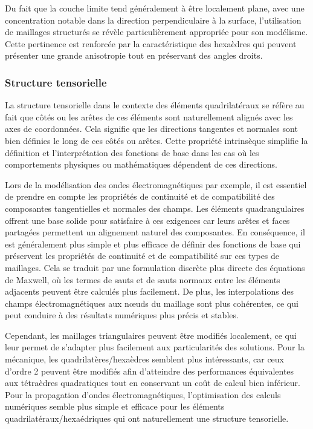 Du fait que la couche limite tend généralement à être localement plane, avec une concentration notable dans la direction perpendiculaire à la surface, l'utilisation de maillages structurés se révèle particulièrement appropriée pour son modélisme. Cette pertinence est renforcée par la caractéristique des hexaèdres qui peuvent présenter une grande anisotropie tout en préservant des angles droits. 

\subsubsection{Structure tensorielle}

 La structure tensorielle dans le contexte des éléments quadrilatéraux se réfère au fait que côtés ou les arêtes de ces éléments sont naturellement alignés avec les axes de coordonnées. Cela signifie que les directions tangentes et normales sont bien définies le long de ces côtés ou arêtes. Cette propriété intrinsèque simplifie la définition et l'interprétation des fonctions de base dans les cas où les comportements physiques ou mathématiques dépendent de ces directions.
 
 Lors de la modélisation des ondes électromagnétiques par exemple, il est essentiel de prendre en compte les propriétés de continuité et de compatibilité des composantes tangentielles et normales des champs. Les éléments quadrangulaires offrent une base solide pour satisfaire à ces exigences car leurs arêtes et faces partagées permettent un alignement naturel des composantes. En conséquence, il est généralement plus simple et plus efficace de définir des fonctions de base qui préservent les propriétés de continuité et de compatibilité sur ces types de maillages. Cela se traduit par une formulation discrète plus directe des équations de Maxwell, où les termes de sauts et de sauts normaux entre les éléments adjacents peuvent être calculés plus facilement. De plus, les interpolations des champs électromagnétiques aux nœuds du maillage sont plus cohérentes, ce qui peut conduire à des résultats numériques plus précis et stables.


Cependant, les maillages triangulaires peuvent être modifiés localement, ce qui leur permet de s’adapter plus facilement aux particularités des solutions.
Pour la mécanique, les quadrilatères/hexaèdres semblent plus intéressants, car ceux d'ordre 2 peuvent être modifiés afin d’atteindre des performances équivalentes aux tétraèdres quadratiques tout en conservant un coût de calcul bien inférieur.
Pour la propagation d’ondes électromagnétiques, l'optimisation des calculs numériques semble plus simple et efficace pour les éléments quadrilatéraux/hexaédriques qui ont naturellement une structure tensorielle.


